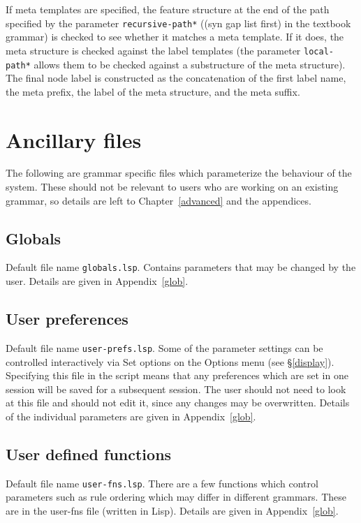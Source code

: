 \documentclass[12pt]{report}
\newcommand{\filename}[1]{{\tt #1}}
\newcommand{\lkbparam}[1]{{\tt #1}}
\newcommand{\lkbmenucommand}{{\bf}}
\begin{document}
If meta templates are specified, the feature structure at the
end of the path specified by the parameter \lkbparam{*recursive-path*}
(({\feature syn gap list first}) in the textbook grammar)
is checked to see whether it matches a meta template.
If it does, the meta structure is checked against the label templates 
(the parameter \lkbparam{*local-path*}
allows them to be checked against a substructure of the meta structure).
The final node label is constructed as the concatenation
of the first label name, the meta prefix, the label of
the meta structure, and the meta suffix.  


\section{Ancillary files}
\label{ancil}

The following are grammar specific files which parameterize the behaviour of
the system.  These should not be relevant to users who are working on an
existing grammar, so details are left to Chapter~\ref{advanced} and the
appendices.

\subsection{Globals}

Default file name \filename{globals.lsp}.
Contains parameters that may be changed by the user.  
Details are given in Appendix~\ref{glob}.

\subsection{User preferences}

Default file name \filename{user-prefs.lsp}.
Some of the parameter settings can be controlled interactively
via {\lkbmenucommand Set options} on the {\lkbmenucommand Options} menu 
(see \S\ref{display}).
Specifying this file in the script means that any preferences 
which are set in one session will be saved for a subsequent session.
The user should not need to look at this file and 
should not edit it, since any changes may be overwritten.
Details of the individual
parameters are given in Appendix~\ref{glob}.

\subsection{User defined functions}

Default file name \filename{user-fns.lsp}.
There are a few functions which control parameters such as rule
ordering which may differ in different grammars.  These are
in the user-fns file (written in Lisp).
Details are given in Appendix~\ref{glob}.
\end{document}
